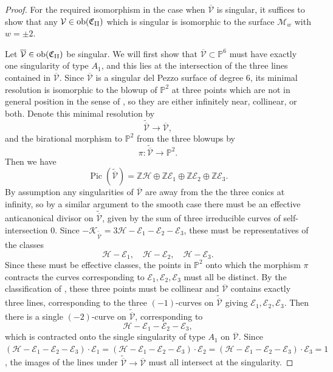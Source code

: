 \documentclass[a4paper,reqno]{amsart}
\numberwithin{equation}{section}
\newcommand{\Z}{\mathbb{Z}}
\newcommand{\p}{\mathbb{P}}
\newcommand{\E}{\mathcal{E}}
\newcommand{\h}{\mathcal{H}}
\newcommand{\Pic}{\operatorname{Pic}}
\numberwithin{equation}{section}
\begin{document}
\begin{proof}
    For the required isomorphism in the case when $\overline{\mathcal{V}}$ is singular, it suffices to show that any $\mathcal{V}\in \operatorname{ob}(\mathfrak{C}_{\rm{II}})$ which is singular is isomorphic to the surface $\mathcal{M}_{w}$ with $w=\pm2$. 

    Let $\overline{\mathcal{V}} \in \operatorname{ob}(\mathfrak{C}_{\rm{II}})$ be singular. 
    We will first show that $\overline{\mathcal{V}}\subset \p^6$ must have exactly one singularity of type $A_1$, and this lies at the intersection of the three lines contained in $\overline{\mathcal{V}}$.
    Since $\overline{\mathcal{V}}$ is a singular del Pezzo surface of degree 6, its minimal resolution is isomorphic to the blowup of $\p^2$ at three points which are not in general position in the sense of \cite[Sec. 8.4]{dolgachevclassicalAG}, so they are either infinitely near, collinear, or both.
    Denote this minimal resolution by  
    $$ \widetilde{\overline{\mathcal{V}}}\to \overline{\mathcal{V}},$$ 
    and the birational morphism to $\p^2$ from the three blowups by 
    $$ \pi : \widetilde{\overline{\mathcal{V}}}\to \p^2.$$
    Then we have 
    $$\Pic(\widetilde{\overline{\mathcal{V}}}) = \Z \h\oplus  \Z \E_1\oplus \Z \E_2  \oplus \Z\E_3.$$
    By assumption any singularities of $\overline{\mathcal{V}}$ are away from the the three conics at infinity, so by a similar argument to the smooth case there must be an effective anticanonical divisor on $\widetilde{\overline{\mathcal{V}}}$, given by the sum of three irreducible curves of self-intersection $0$.
    Since $-\mathcal{K}_{\widetilde{\overline{\mathcal{V}}}}=3 \h - \E_1-\E_2-\E_3$, these must be representatives of the classes 
    $$ \h-\E_1, \quad \h-\E_2, \quad \h-\E_3.$$
    Since these must be effective classes, the points in $\p^2$ onto which the morphism $\pi$ contracts the curves corresponding to $\E_1,\E_2,\E_3$ must all be distinct.
    By the classification of \cite[Sec. 8.4.2]{dolgachevclassicalAG}, these three points must be collinear and $\overline{\mathcal{V}}$ contains exactly three lines, corresponding to the three $(-1)$-curves on $\widetilde{\overline{\mathcal{V}}}$ giving $\E_1,\E_2,\E_3$.
    Then there is a single $(-2)$-curve on $\widetilde{\overline{\mathcal{V}}}$, corresponding to 
    $$\h - \E_1-\E_2-\E_3,$$
    which is contracted onto the single singularity of type $A_1$ on $\overline{\mathcal{V}}$.
    Since $(\h-\E_1-\E_2-\E_3)\cdot \E_1=(\h-\E_1-\E_2-\E_3)\cdot \E_2=(\h-\E_1-\E_2-\E_3)\cdot \E_3= 1$, the images of the lines under $\widetilde{\overline{\mathcal{V}}}\to \overline{\mathcal{V}}$ must all intersect at the singularity.


\end{proof}
\end{document}
